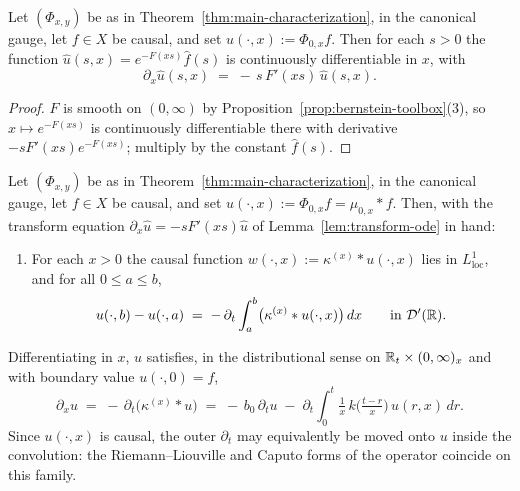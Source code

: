 \begin{lemma}\label{lem:transform-ode}
Let $(\Phi_{x,y})$ be as in Theorem~\ref{thm:main-characterization}, in the canonical gauge,
let $f \in X$ be causal, and set $u(\cdot, x) := \Phi_{0,x} f$. Then for each $s > 0$ the
function $\hat u(s, x) = e^{-F(xs)}\hat f(s)$ is continuously differentiable in $x$, with
\[
  \partial_x \hat u(s, x) \;=\; -\,s\,F'(xs)\,\hat u(s, x).
\]
\end{lemma}

\begin{proof}
$F$ is smooth on $(0,\infty)$ by Proposition~\ref{prop:bernstein-toolbox}(3), so
$x \mapsto e^{-F(xs)}$ is continuously differentiable there with derivative
$-sF'(xs)e^{-F(xs)}$; multiply by the constant $\hat f(s)$.
\end{proof}

\begin{proposition}\label{prop:scale-evolution}
Let $(\Phi_{x,y})$ be as in Theorem~\ref{thm:main-characterization}, in the canonical gauge,
let $f \in X$ be causal, and set $u(\cdot, x) := \Phi_{0,x} f = \mu_{0,x} * f$. Then, with the
transform equation $\partial_x \hat u = -sF'(xs)\hat u$ of Lemma~\ref{lem:transform-ode} in
hand:
\begin{enumerate}
\item[] For each $x > 0$ the causal function $w(\cdot, x) := \kappa^{(x)} * u(\cdot, x)$ lies in
$L^1_{\mathrm{loc}}$, and for all $0 \le a \le b$,
\[
  u(\cdot, b) - u(\cdot, a)
  \;=\; -\,\partial_t \int_a^b \bigl(\kappa^{(x)} * u(\cdot, x)\bigr)\,dx
  \qquad \text{in } \mathcal{D}'(\mathbb{R}).
\]
\end{enumerate}
Differentiating in $x$, $u$ satisfies, in the distributional sense on
$\mathbb{R}_t \times (0,\infty)_x$ and with boundary value $u(\cdot, 0) = f$,
\[
  \partial_x u \;=\; -\,\partial_t\bigl(\kappa^{(x)} * u\bigr)
  \;=\; -\,b_0\,\partial_t u
  \;-\; \partial_t \int_0^t \tfrac{1}{x}\,k\bigl(\tfrac{t-r}{x}\bigr)\,u(r, x)\,dr .
\]
Since $u(\cdot, x)$ is causal, the outer $\partial_t$ may equivalently be moved onto $u$ inside
the convolution: the Riemann--Liouville and Caputo forms of the operator coincide on this
family.
\end{proposition}

